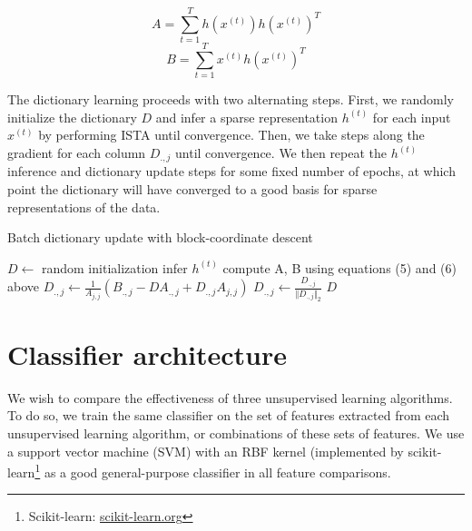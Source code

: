 \documentclass{article} %
\begin{document}
\begin{equation}
A = \sum_{t=1}^T h(x^{(t)}) h(x^{(t)})^T
\end{equation}
\begin{equation}
B = \sum_{t=1}^T x^{(t)} h(x^{(t)})^T
\end{equation}


The dictionary learning proceeds with two alternating steps. First, we randomly initialize the dictionary $D$ and infer a sparse representation $h^{(t)}$ for each input $x^{(t)}$ by performing ISTA until convergence. Then, we take steps along the gradient for each column $D_{.,j}$ until convergence. We then repeat the $h^{(t)}$ inference and dictionary update steps for some fixed number of epochs, at which point the dictionary will have converged to a good basis for sparse representations of the data.


\begin{algorithm}
\caption{Batch dictionary update with block-coordinate descent}
\begin{algorithmic}[1]
\State $D\gets$ random initialization
		\State infer $h^{(t)}$ 
	\EndFor
	\State compute A, B using equations (5) and (6) above
			\State $D_{.,j}\gets \frac{1}{A_{j,j}} (B_{.,j} - D A_{.,j} + D_{.,j} A_{j,j})$
			\State $D_{.,j}\gets \frac{D_{.,j}}{\Vert D_{.,j} \Vert_2}$ 
		\EndFor
	\EndWhile
\EndWhile
\State\Return $D$
\end{algorithmic}
\end{algorithm}

\section{Classifier architecture}
We wish to compare the effectiveness of three unsupervised learning algorithms. To do so, we train the same classifier on the set of features extracted from each unsupervised learning algorithm, or combinations of these sets of features. We use a support vector machine (SVM) with an RBF kernel (implemented by scikit-learn\footnote{Scikit-learn: \url{scikit-learn.org}} as a good general-purpose classifier in all feature comparisons.
\end{document}
